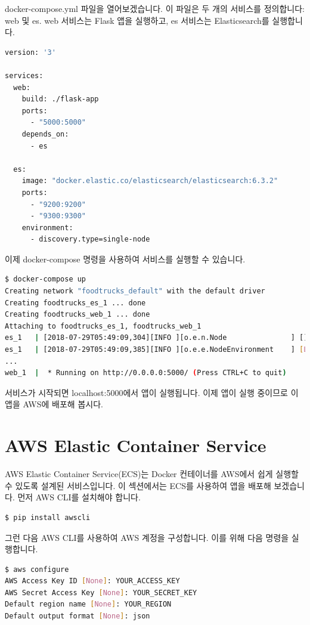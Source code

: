docker-compose.yml 파일을 열어보겠습니다. 이 파일은 두 개의 서비스를 정의합니다: web 및 es. web 서비스는 Flask 앱을 실행하고, es 서비스는 Elasticsearch를 실행합니다.
\begin{lstlisting}[language=dockerfile]
version: '3'

services:
  web:
    build: ./flask-app
    ports:
      - "5000:5000"
    depends_on:
      - es

  es:
    image: "docker.elastic.co/elasticsearch/elasticsearch:6.3.2"
    ports:
      - "9200:9200"
      - "9300:9300"
    environment:
      - discovery.type=single-node
\end{lstlisting}

이제 docker-compose 명령을 사용하여 서비스를 실행할 수 있습니다.
\begin{lstlisting}[language=bash]
$ docker-compose up
Creating network "foodtrucks_default" with the default driver
Creating foodtrucks_es_1 ... done
Creating foodtrucks_web_1 ... done
Attaching to foodtrucks_es_1, foodtrucks_web_1
es_1   | [2018-07-29T05:49:09,304][INFO ][o.e.n.Node               ] [] initializing ...
es_1   | [2018-07-29T05:49:09,385][INFO ][o.e.e.NodeEnvironment    ] [L1VMyzt] using [1] data paths, mounts [[/ (overlay)]], net usable_space [54.1gb], net total_space [62.7gb], types [overlay]
...
web_1  |  * Running on http://0.0.0.0:5000/ (Press CTRL+C to quit)
\end{lstlisting}

서비스가 시작되면 localhost:5000에서 앱이 실행됩니다. 이제 앱이 실행 중이므로 이 앱을 AWS에 배포해 봅시다.

\section{AWS Elastic Container Service}
AWS Elastic Container Service(ECS)는 Docker 컨테이너를 AWS에서 쉽게 실행할 수 있도록 설계된 서비스입니다. 이 섹션에서는 ECS를 사용하여 앱을 배포해 보겠습니다. 먼저 AWS CLI를 설치해야 합니다.
\begin{lstlisting}[language=bash]
$ pip install awscli
\end{lstlisting}

그런 다음 AWS CLI를 사용하여 AWS 계정을 구성합니다. 이를 위해 다음 명령을 실행합니다.
\begin{lstlisting}[language=bash]
$ aws configure
AWS Access Key ID [None]: YOUR_ACCESS_KEY
AWS Secret Access Key [None]: YOUR_SECRET_KEY
Default region name [None]: YOUR_REGION
Default output format [None]: json
\end{lstlisting}

